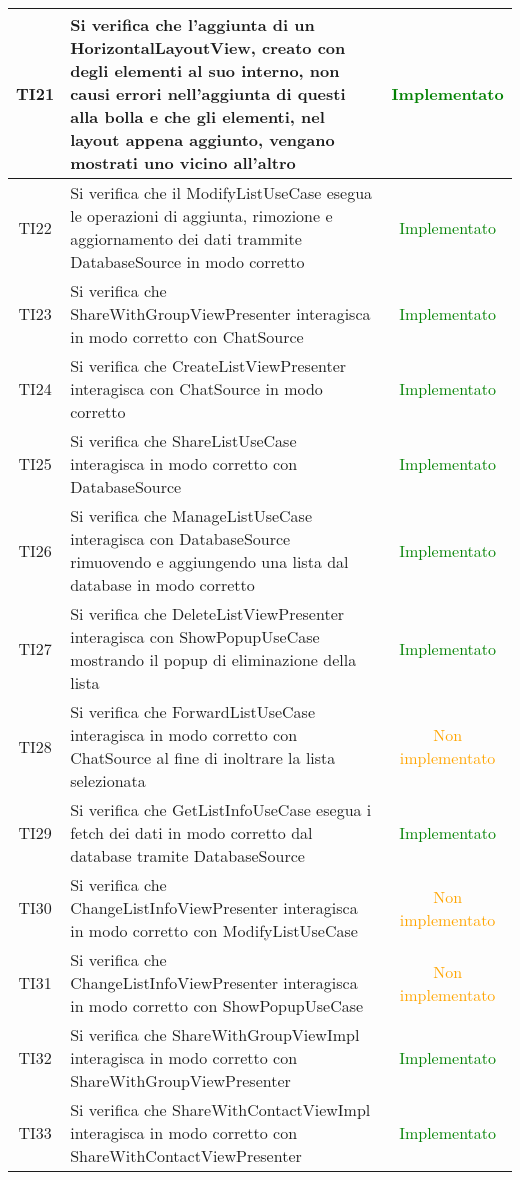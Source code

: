 \begin{center}
\begin{longtable}{|c|>{\centering}m{10cm}|c|}
		TI21 & Si verifica che l'aggiunta di un HorizontalLayoutView, creato con degli elementi al suo interno, non causi errori nell'aggiunta di questi alla bolla e che gli elementi, nel layout appena aggiunto, vengano mostrati uno vicino all'altro & \textcolor{Green}{Implementato}\\ \hline
		TI22 & Si verifica che il ModifyListUseCase esegua le operazioni di aggiunta, rimozione e aggiornamento dei dati trammite DatabaseSource in modo corretto & \textcolor{Green}{Implementato}\\ \hline
		TI23 & Si verifica che ShareWithGroupViewPresenter interagisca in modo corretto con ChatSource & \textcolor{Green}{Implementato}\\ \hline
		TI24 & Si verifica che CreateListViewPresenter interagisca con ChatSource in modo corretto & \textcolor{Green}{Implementato}\\ \hline
		TI25 & Si verifica che ShareListUseCase interagisca in modo corretto con DatabaseSource & \textcolor{Green}{Implementato}\\ \hline
		TI26 & Si verifica che ManageListUseCase interagisca con DatabaseSource rimuovendo e aggiungendo una lista dal database in modo corretto & \textcolor{Green}{Implementato}\\ \hline
		TI27 & Si verifica che DeleteListViewPresenter interagisca con ShowPopupUseCase mostrando il popup di eliminazione della lista & \textcolor{Green}{Implementato}\\ \hline
		TI28 & Si verifica che ForwardListUseCase interagisca in modo corretto con ChatSource al fine di inoltrare la lista selezionata & \textcolor{Orange}{Non implementato}\\ \hline
		TI29 & Si verifica che GetListInfoUseCase esegua i fetch dei dati in modo corretto dal database tramite DatabaseSource & \textcolor{Green}{Implementato}\\ \hline
		TI30 & Si verifica che ChangeListInfoViewPresenter interagisca in modo corretto con ModifyListUseCase & \textcolor{Orange}{Non implementato}\\ \hline
		TI31 & Si verifica che ChangeListInfoViewPresenter interagisca in modo corretto con ShowPopupUseCase & \textcolor{Orange}{Non implementato}\\ \hline
		TI32 & Si verifica che ShareWithGroupViewImpl interagisca in modo corretto con ShareWithGroupViewPresenter & \textcolor{Green}{Implementato}\\ \hline
		TI33 & Si verifica che ShareWithContactViewImpl interagisca in modo corretto con ShareWithContactViewPresenter & \textcolor{Green}{Implementato}\\ \hline

\end{longtable}
\end{center}
